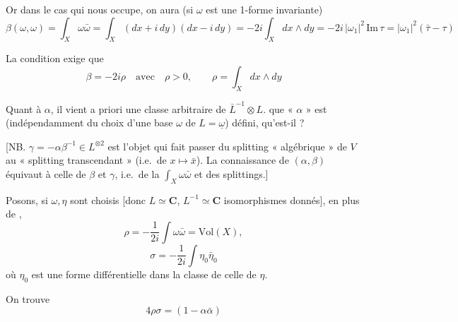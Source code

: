 \documentclass[11pt,a4paper]{article}
\begin{document}
Or dans le cas qui nous occupe, on aura (si $\omega$ est une 1-forme
invariante)
\[
\beta(\omega,\omega) = \int_X\omega\bar\omega = \int_X(dx+i\,dy)(dx-i\,dy)
= -2i\int_X dx\wedge dy = -2i\,|\omega_1|^2\,\mathrm{Im}\,\tau
= |\omega_1|^2(\bar\tau-\tau)
\]

La condition  exige  que
\[
\beta = -2i\rho \quad\text{avec}\quad \rho>0, \qquad \rho = \int_X dx\wedge dy
\]

Quant à $\alpha$, il vient a priori une classe arbitraire de
$\bar L^{-1}\otimes L$.  que « $\alpha$ » est
(indépendamment du choix d'une base $\omega$ de $L=\underline{\omega}$)
défini, qu'est-il ?

[NB. $\gamma = -\alpha\beta^{-1}\in L^{\otimes 2}$ est l'objet qui fait
passer du splitting « algébrique » de $V$ au « splitting transcendant »
 (i.e.\ de $x\mapsto\bar x$). La connaissance de $(\alpha,\beta)$
équivaut à celle de $\beta$ et $\gamma$, i.e.\ de la  $\int_X\omega\bar\omega$ et des splittings.]

Posons, si $\omega,\eta$ sont choisis [donc $L\simeq\mathbf{C}$,
$L^{-1}\simeq\mathbf{C}$ isomorphismes donnés], en plus de
,
\[
\rho = -\frac{1}{2i}\int\omega\bar\omega = \mathrm{Vol}(X),
\]
\[
\sigma = -\frac{1}{2i}\int\eta_0\bar\eta_0
\]
où $\eta_0$ est une forme différentielle  dans la classe
de celle de $\eta$.

On trouve
\[
4\rho\sigma = (1-\alpha\bar\alpha)
\]
\end{document}
